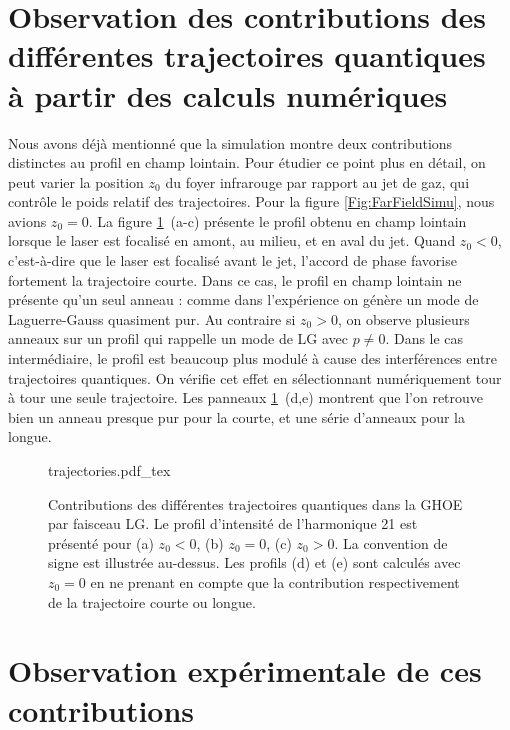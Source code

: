 \section{Observation des contributions des différentes trajectoires quantiques à partir des calculs numériques}
Nous avons déjà mentionné que la simulation montre deux contributions distinctes au profil en champ lointain. Pour étudier ce point plus en détail, on peut varier la position $z_0$ du foyer infrarouge par rapport au jet de gaz, qui contrôle le poids relatif des trajectoires. Pour la figure \ref{Fig:FarFieldSimu}, nous avions $z_0=0$. La figure \ref{Fig:H21_traj}~(a-c) présente le profil obtenu en champ lointain lorsque le laser est focalisé en amont, au milieu, et en aval du jet. Quand $z_0<0$, c'est-à-dire que le laser est focalisé avant le jet, l'accord de phase favorise fortement la trajectoire courte. Dans ce cas, le profil en champ lointain ne présente qu'un seul anneau : comme dans l'expérience on génère un mode de Laguerre-Gauss quasiment pur. Au contraire si $z_0>0$, on observe plusieurs anneaux sur un profil qui rappelle un mode de LG avec $p\neq 0$. Dans le cas intermédiaire, le profil est beaucoup plus modulé à cause des interférences entre trajectoires quantiques. On vérifie cet effet en sélectionnant numériquement tour à tour une seule trajectoire. Les panneaux \ref{Fig:H21_traj}~(d,e) montrent que l'on retrouve bien un anneau presque pur pour la courte, et une série d'anneaux pour la longue.


\begin{figure}[!ht]
\centering
\def\svgwidth{.7\columnwidth}
{trajectories.pdf_tex}
\caption{Contributions des différentes trajectoires quantiques dans la GHOE par faisceau LG. Le profil d'intensité de l'harmonique 21 est présenté pour (a) $z_0<0$, (b) $z_0=0$, (c) $z_0>0$. La convention de signe est illustrée au-dessus. Les profils (d) et (e) sont calculés avec $z_0=0$ en ne prenant en compte que la contribution respectivement de la trajectoire courte ou longue.}
\label{Fig:H21_traj}
\end{figure}

\section{Observation expérimentale de ces contributions}
